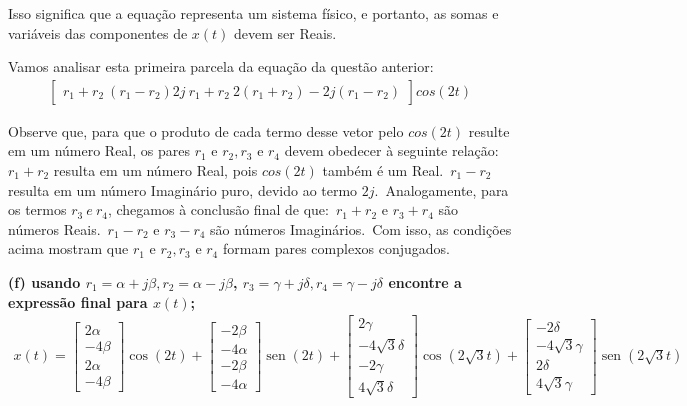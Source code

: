 \documentclass[11pt]{article}
\DeclareMathOperator{\sen}{sen}
\begin{document}
Isso significa que a equação representa um sistema físico, e portanto, as somas e variáveis das componentes de $x(t)$ devem ser Reais.

Vamos analisar esta primeira parcela da equação da questão anterior:
\begin{align}
  \begin{bmatrix}
    r_1+r_2\
    (r_1-r_2)2j\
    r_1+r_2\
    2(r_1+r_2)-2j(r_1-r_2)
  \end{bmatrix}
  cos(2t)
\end{align}

Observe que, para que o produto de cada termo desse vetor pelo $cos(2t)$ resulte em um número Real, os pares $r_1 \text{ e } r_2, r_3 \text{ e } r_4$ devem obedecer à seguinte relação:\
$r_1+r_2$ resulta em um número Real, pois $cos(2t)$ também é um Real.\
$r_1-r_2$ resulta em um número Imaginário puro, devido ao termo $2j$.\
Analogamente, para os termos $r_3\ e\ r_4$, chegamos à conclusão final de que:\
$r_1+r_2$ e $r_3+r_4$ são números Reais.\
$r_1-r_2$ e $r_3-r_4$ são números Imaginários.\
Com isso, as condições acima mostram que $r_1 \text{ e } r_2, r_3 \text{ e } r_4$ formam pares complexos conjugados.\

\textbf{(f) usando $r_1 = \alpha + j\beta, r_2 = \alpha - j\beta$, $r_3 = \gamma + j\delta, r_4 = \gamma - j\delta$ encontre a expressão final para $x(t)$;}
\begin{align*}
  x(t) =
  \begin{bmatrix}
    2\alpha\\
    -4\beta\\
    2\alpha\\
    -4\beta
  \end{bmatrix}
  \cos(2t) +
  \begin{bmatrix}
    -2\beta\\
    -4\alpha\\
    -2\beta\\
    -4\alpha
  \end{bmatrix}
  \sen(2t) +
  \begin{bmatrix}
    2\gamma\\
    -4\sqrt{3}\delta\\
    -2\gamma\\
    4\sqrt{3}\delta
  \end{bmatrix}
  \cos(2\sqrt{3}t) +
  \begin{bmatrix}
    -2\delta\\
    -4\sqrt{3}\gamma\\
    2\delta\\
    4\sqrt{3}\gamma
  \end{bmatrix}
  \sen(2\sqrt{3}t)
\end{align*}
\end{document}
